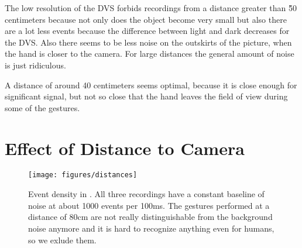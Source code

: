 The low resolution of the DVS forbids recordings from a distance greater than \~ 50 centimeters because not only does the object become very small but also there are a lot less events because the difference between light and dark decreases for the DVS.
Also there seems to be less noise on the outskirts of the picture, when the hand is closer to the camera.
For large distances the general amount of noise is just ridiculous.

A distance of around 40 centimeters seems optimal, because it is close enough for significant signal, but not so close that the hand leaves the field of view during some of the gestures.

\section{Effect of Distance to Camera}
\label{sec:distances}

\begin{figure}
  \centering
  \texttt{[image: figures/distances]}
  \caption{Event density in . All three recordings have a constant
    baseline of noise at about 1000 events per 100ms. The gestures performed at a
    distance of 80cm are not really distinguishable from the background noise
    anymore and it is hard to recognize anything even for humans, so we exlude them.}
\end{figure}